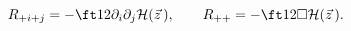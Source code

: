 \begin{equation}
R_{+i+j}=-\ft12\partial_i\partial_j{\cal H}(\vec z\,),\qquad
R_{++}=-\ft12\square {\cal H}(\vec z\,).
\end{equation}

